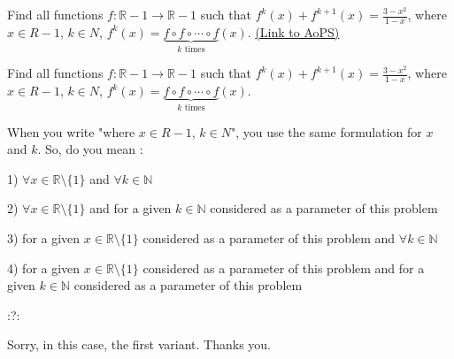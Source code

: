 \begin{problem}
	Find all functions $f: \mathbb{R}-{1}\to\mathbb{R}-{1}$ such that $f^{k}(x)+f^{k+1}(x)=\frac{3-x^2}{1-x}$, where $x{\in}R-{1}$, $k{{\in}N}$, $f^{k}(x)= \underbrace{f{\circ}f{\circ}\cdots{\circ}f}_{k\textrm{ times}}(x)$.
	\flushright \href{https://artofproblemsolving.com/community/c6h567285}{(Link to AoPS)}
\end{problem}



\begin{solution}
	\begin{tcolorbox}Find all functions $f: \mathbb{R}-{1}\to\mathbb{R}-{1}$ such that $f^{k}(x)+f^{k+1}(x)=\frac{3-x^2}{1-x}$, where $x{\in}R-{1}$, $k{{\in}N}$, $f^{k}(x)= \underbrace{f{\circ}f{\circ}\cdots{\circ}f}_{k\textrm{ times}}(x)$.\end{tcolorbox}
When you write "where $x{\in}R-{1}$, $k{{\in}N}$", you use the same formulation for $x$ and $k$. So, do you mean :

1) $\forall x\in\mathbb R\setminus\{1\}$ and $\forall k\in\mathbb N$ 

2) $\forall x\in\mathbb R\setminus\{1\}$ and for a given $k\in\mathbb N$ considered as a parameter of this problem

3) for a given $x\in\mathbb R\setminus\{1\}$ considered as a parameter of this problem and $\forall k\in\mathbb N$ 

4) for a given $x\in\mathbb R\setminus\{1\}$ considered as a parameter of this problem and  for a given $k\in\mathbb N$ considered as a parameter of this problem

:?:
\end{solution}



\begin{solution}
	Sorry, in this case, the first variant. Thanks you.
\end{solution}



